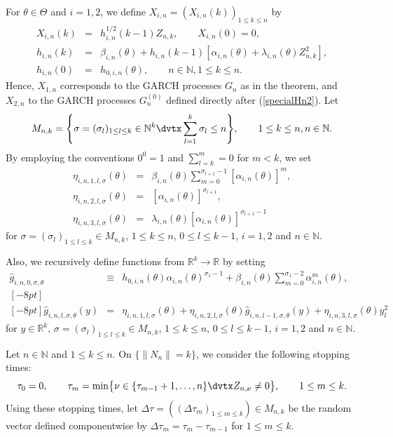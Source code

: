 \documentclass[number,citesort,seceqn,dvips]{arxbj}
\newcommand{\eqref}[1]{(\ref{#1})}
\newcommand{\RR}{\mathbb{R}}
\newcommand{\NN}{\mathbb{N}}
\begin{document}
For $\theta\in\Theta$ and $i=1,2$, we define
$X_{i,n}=(X_{i,n}(k))_{1\le k\le n}$ by
%
\begin{eqnarray}\label{Xip}
X_{i,n}(k)&=&h^{1/2}_{i,n}(k - 1) Z_{n,k},\qquad
X_{i,n}(0)=0 ,\nonumber\\
h_{i,n}(k)&=&\beta_{i,n}(\theta)+
h_{i,n}(k - 1)  [\alpha_{i,n}(\theta)+\lambda_{i,n}(\theta)
 Z_{n,k}^2 ] ,\\
h_{i,n}(0)&=&h_{0,i,n}(\theta) ,\qquad  n\in\NN , 1 \le
k \le  n .\nonumber
\end{eqnarray}
%
Hence, $X_{1,n}$ corresponds to the GARCH processes $G_n$ as in the
theorem, and $X_{2,n}$ to the GARCH processes $G_n^{(0)}$ defined
directly after \eqref{specialHn2}. Let
%
\begin{equation}\label{defMnk}
M_{n,k} =  \Biggl\{\sigma=(\sigma
_l)_{1\le l\le k}\in\NN^k \dvtx  \sum_{l=1}^k\sigma_l\le n \Biggr\},\qquad 1 \le
k \le  n , n\in\NN.
\end{equation}
%
By employing the conventions
$0^0=1$ and $\sum_{l=k}^m=0$ for $m < k$, we set
%
\begin{eqnarray}\label{defhateta}
\eta_{i,n,1,l,\sigma}(\theta)&=&\beta_{i,n}(\theta)\sum
_{m=0}^{\sigma_{l + 1} - 1}[\alpha_{i,n}(\theta)]^m ,\nonumber\\
\eta_{i,n,2,l,\sigma}(\theta)&=&[\alpha_{i,n}(\theta)]^{\sigma
_{l + 1}} ,\\
\eta_{i,n,3,l,\sigma}(\theta)&=&\lambda_{i,n}(\theta) [\alpha
_{i,n}(\theta)]^{\sigma_{l + 1} - 1}\nonumber
\end{eqnarray}
%
for $\sigma=(\sigma_l)_{1\le l\le k}\in M_{n,k}$, $1 \le  k \le
n$, $0 \le  l \le  k - 1$, $i=1,2$ and $n\in\NN$.

Also, we recursively define functions from $\RR^k\to\RR$ by setting
%
\begin{eqnarray}\label{defhatg}
\hat g_{i,n,0,\sigma,\theta}&\equiv&h_{0,i,n}(\theta) \alpha
_{i,n}(\theta)^{\sigma_1-1}+\beta_{i,n}(\theta)
\sum_{m=0}^{\sigma_1-2}\alpha_{i,n}^m(\theta) ,\nonumber\\ [-8pt]\\ [-8pt]
\hat g_{i,n,l,\sigma,\theta}(y)&=&\eta_{i,n,1,l,\sigma}(\theta)+\eta
_{i,n,2,l,\sigma}(\theta)
\hat g_{i,n,l - 1,\sigma,\theta}(y)+\eta_{i,n,3,l,\sigma}(\theta)
 y_l^2\nonumber
\end{eqnarray}
%
for $y\in\RR^k$, $\sigma=(\sigma_l)_{1\le l\le k}\in M_{n,k}$,
$1 \le  k \le  n$, $0 \le  l \le  k - 1$, $i=1,2$ and
$n\in\NN$.

Let $n\in\NN$ and $1 \le  k \le  n$. On $\{\|N_n\|=k\}$, we
consider the following stopping times:
%
\[
\tau_{0}=0 ,\qquad \tau_{m}=\min\bigl\{\nu\in\{\tau_{m-1} + 1,\dots
,n\}\dvtx Z_{n,\nu}\neq0\bigr\},\qquad 1 \le
m \le  k .
\]
%
Using these stopping times, let $\Delta\tau=((\Delta
\tau_m)_{1\le m\le k})\in M_{n,k}$ be the random vector defined
componentwise by $\Delta\tau_m=\tau_m-\tau_{m - 1}$ for $1 \le
m \le  k$.
\end{document}
